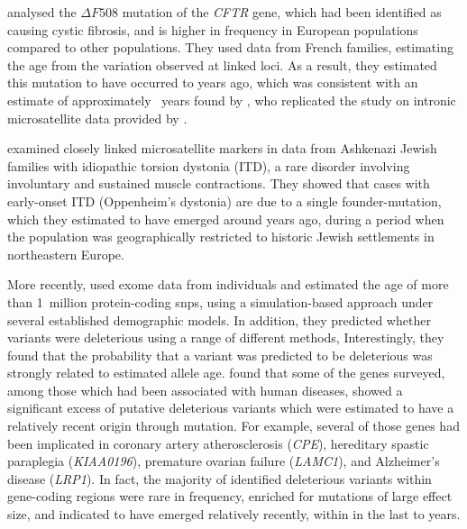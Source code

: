  analysed the ${\Delta{F508}}$ mutation of the \textsl{CFTR} gene, which had been identified as causing cystic fibrosis, and is higher in frequency in European populations compared to other populations.
They used  data from  French families, estimating the age from the variation observed at  linked loci.
As a result, they estimated this mutation to have occurred  to  years ago, which was consistent with an estimate of approximately ~years found by \citet{Slatkin:2000us}, who replicated the study on intronic microsatellite data provided by \citet{Morral:1994vx}.

 examined  closely linked microsatellite markers in data from  Ashkenazi Jewish families with idiopathic torsion dystonia (ITD), a rare disorder involving involuntary and sustained muscle contractions.
They showed that cases with early-onset ITD (Oppenheim's dystonia) are due to a single founder-mutation, which they estimated to have emerged around  years ago, during a period when the population was geographically restricted to historic Jewish settlements in northeastern Europe.

More recently, \citet{Fu:2012hg} used exome data from  individuals and estimated the age of more than 1~million protein-coding \glspl{snp}, using a simulation-based approach under several established demographic models.
In addition, they predicted whether variants were deleterious using a range of different methods, Interestingly, they found that the probability that a variant was predicted to be deleterious was strongly related to estimated allele age.
 found that some of the genes surveyed, among those which had been associated with human diseases, showed a significant excess of putative deleterious variants which were estimated to have a relatively recent origin through mutation.
For example, several of those genes had been implicated in coronary artery atherosclerosis (\textsl{CPE}), hereditary spastic paraplegia (\textsl{KIAA0196}), premature ovarian failure (\textsl{LAMC1}), and Alzheimer's disease (\textsl{LRP1}).
In fact, the majority of identified deleterious variants within gene-coding regions were rare in frequency, enriched for mutations of large effect size, and indicated to have emerged relatively recently, within in the last  to  years.

